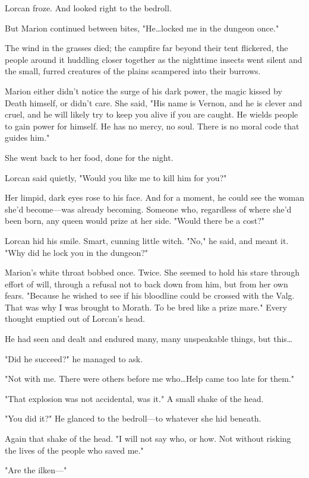 Lorcan froze.
And looked right to the bedroll.

But Marion continued between bites, "He\ldots locked me in the dungeon once."

The wind in the grasses died; the campfire far beyond their tent flickered, the people around it huddling closer together as the nighttime insects went silent and the small, furred creatures of the plains scampered into their burrows.

Marion either didn't notice the surge of his dark power, the magic kissed by Death himself, or didn't care.
She said, "His name is Vernon, and he is clever and cruel, and he will likely try to keep you alive if you are caught.
He wields people to gain power for himself.
He has no mercy, no soul.
There is no moral code that guides him."

She went back to her food, done for the night.

Lorcan said quietly, "Would you like me to kill him for you?"

Her limpid, dark eyes rose to his face.
And for a moment, he could see the woman she'd become---was already becoming.
Someone who, regardless of where she'd been born, any queen would prize at her side.
"Would there be a cost?"

Lorcan hid his smile.
Smart, cunning little witch.
"No," he said, and meant it.
"Why did he lock you in the dungeon?"

Marion's white throat bobbed once.
Twice.
She seemed to hold his stare through effort of will, through a refusal not to back down from him, but from her own fears.
"Because he wished to see if his bloodline could be crossed with the Valg.
That was why I was brought to Morath.
To be bred like a prize mare."
Every thought emptied out of Lorcan's head.

He had seen and dealt and endured many, many unspeakable things, but this\ldots{}

"Did he succeed?"
he managed to ask.

"Not with me.
There were others before me who\ldots Help came too late for them."

"That explosion was not accidental, was it."
A small shake of the head.

"You did it?"
He glanced to the bedroll---to whatever she hid beneath.

Again that shake of the head.
"I will not say who, or how.
Not without risking the lives of the people who saved me."

"Are the ilken---"

